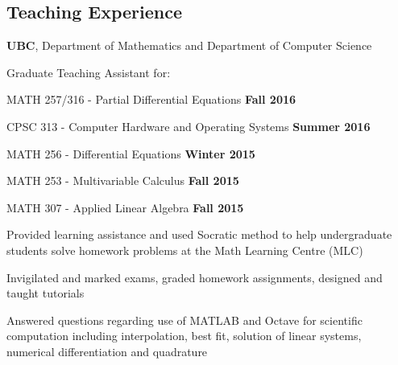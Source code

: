 \documentclass[margin,line]{res}
\newenvironment{list1}{
  \begin{list}{\ding{113}}{
      \setlength{\itemsep}{0in}
      \setlength{\parsep}{0in} \setlength{\parskip}{0in}
      \setlength{\topsep}{0in} \setlength{\partopsep}{0in} 
      \setlength{\leftmargin}{0.17in}}}{\end{list}}
\newenvironment{list3}{
  \begin{list}{\textopenbullet}{
      \setlength{\itemsep}{0in}
      \setlength{\parsep}{0in} \setlength{\parskip}{0in}
      \setlength{\topsep}{0in} \setlength{\partopsep}{0in} 
      \setlength{\leftmargin}{0.1in}}}{\end{list}}
\begin{document}
\begin{resume}
\vspace*{.4cm}

\section{\sc Teaching Experience}

{\bf  UBC}, Department of Mathematics and Department of Computer Science\\
\vspace*{-.2cm}
\begin{list1}
\item[] Graduate Teaching Assistant for:\\[-0.1cm]
\item[] MATH 257/316 - Partial Differential Equations \hfill {\bf Fall 2016}
\item[] CPSC 313 - Computer Hardware and Operating Systems \hfill {\bf Summer 2016}
\item[] MATH 256 - Differential Equations \hfill {\bf Winter 2015}
\item[] MATH 253 - Multivariable Calculus \hfill {\bf Fall 2015}
\item[] MATH 307 - Applied Linear Algebra \hfill {\bf Fall 2015}\\
\begin{list3}
\vspace*{-.1cm}
\item Provided learning assistance and used Socratic method to help undergraduate students solve homework problems at the Math Learning Centre (MLC)
\item Invigilated and marked exams, graded homework assignments, designed and taught tutorials
\item Answered questions regarding use of MATLAB and Octave for scientific computation including interpolation, best fit, solution of linear systems, numerical differentiation and quadrature
\end{list3}
\end{list1}
\vspace*{.1cm}


\end{resume}
\end{document}
